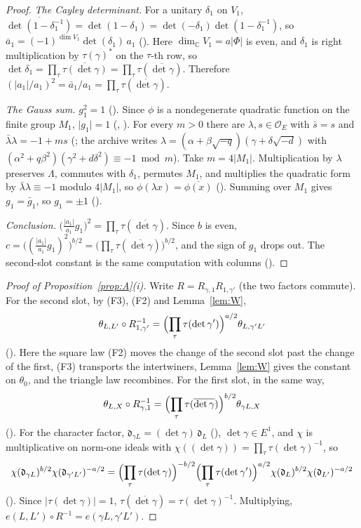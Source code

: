\documentclass[11pt]{article}
\newcommand{\OEr}{\mathcal O_E}
\theoremstyle{definition}
\theoremstyle{remark}
\begin{document}
\begin{proof}
\emph{The Cayley determinant.} For a unitary $\delta_1$ on $V_1$, $\overline{\det(1-\delta_1^{-1})}=\det(1-\delta_1)=\det(-\delta_1)\det(1-\delta_1^{-1})$, so $\bar a_1=(-1)^{\dim V_1}\det(\delta_1)\,a_1$ (). Here $\dim_{\mathbb C}V_1=a\lvert\Phi\rvert$ is even, and $\delta_1$ is right multiplication by $\tau(\gamma)^*$ on the $\tau$-th row, so $\det\delta_1=\prod_\tau\overline{\tau(\det\gamma)}=\prod_\tau\tau(\overline{\det\gamma})$. Therefore $(\lvert a_1\rvert/a_1)^2=\bar a_1/a_1=\prod_\tau\tau(\overline{\det\gamma})$.

\emph{The Gauss sum.} $g_1^2=1$ (). Since $\phi$ is a nondegenerate quadratic function on the finite group $M_1$, $\lvert g_1\rvert=1$ (, ). For every $m>0$ there are $\lambda,s\in\OEr$ with $\bar s=s$ and $\bar\lambda\lambda=-1+ms$ (; the archive writes $\lambda=(\alpha+\beta\sqrt{-q})(\gamma+\delta\sqrt{-d})$ with $(\alpha^2+q\beta^2)(\gamma^2+d\delta^2)\equiv-1\bmod m$). Take $m=4\lvert M_1\rvert$. Multiplication by $\lambda$ preserves $\Lambda$, commutes with $\delta_1$, permutes $M_1$, and multiplies the quadratic form by $\bar\lambda\lambda\equiv-1$ modulo $4\lvert M_1\rvert$, so $\phi(\lambda x)=\overline{\phi(x)}$ (). Summing over $M_1$ gives $g_1=\bar g_1$, so $g_1=\pm1$ ().

\emph{Conclusion.} $\bigl(\tfrac{\lvert a_1\rvert}{a_1}g_1\bigr)^2=\prod_\tau\tau(\overline{\det\gamma})$. Since $b$ is even, $c=\bigl((\tfrac{\lvert a_1\rvert}{a_1}g_1)^2\bigr)^{b/2}=\bigl(\prod_\tau\tau(\overline{\det\gamma})\bigr)^{b/2}$, and the sign of $g_1$ drops out. The second-slot constant is the same computation with columns ().
\end{proof}

\begin{proof}[Proof of Proposition~\ref{prop:A}(i)]
Write $R=R_{\gamma,1}R_{1,\gamma'}$ (the two factors commute). For the second slot, by (F3), (F2) and Lemma~\ref{lem:W},
\[
\theta_{L,L'}\circ R_{1,\gamma'}^{-1}=\Bigl(\prod_\tau\tau(\det\gamma')\Bigr)^{a/2}\theta_{L,\gamma'L'}
\]
(). Here the square law (F2) moves the change of the second slot past the change of the first, (F3) transports the intertwiners, Lemma~\ref{lem:W} gives the constant on $\theta_0$, and the triangle law recombines. For the first slot, in the same way,
\[
\theta_{L,X}\circ R_{\gamma,1}^{-1}=\Bigl(\prod_\tau\tau(\overline{\det\gamma})\Bigr)^{b/2}\theta_{\gamma L,X}
\]
(). For the character factor, $\mathfrak d_{\gamma L}=(\det\gamma)\,\mathfrak d_L$ (), $\det\gamma\in E^1$, and $\chi$ is multiplicative on norm-one ideals with $\chi((\det\gamma))=\prod_\tau\tau(\det\gamma)^{-1}$, so
\[
\chi(\mathfrak d_{\gamma L})^{b/2}\chi(\mathfrak d_{\gamma'L'})^{-a/2}=\Bigl(\prod_\tau\tau(\det\gamma)\Bigr)^{-b/2}\Bigl(\prod_\tau\tau(\det\gamma')\Bigr)^{a/2}\chi(\mathfrak d_L)^{b/2}\chi(\mathfrak d_{L'})^{-a/2}
\]
(). Since $\lvert\tau(\det\gamma)\rvert=1$, $\tau(\overline{\det\gamma})=\tau(\det\gamma)^{-1}$. Multiplying, $e(L,L')\circ R^{-1}=e(\gamma L,\gamma'L')$.
\end{proof}
\end{document}
